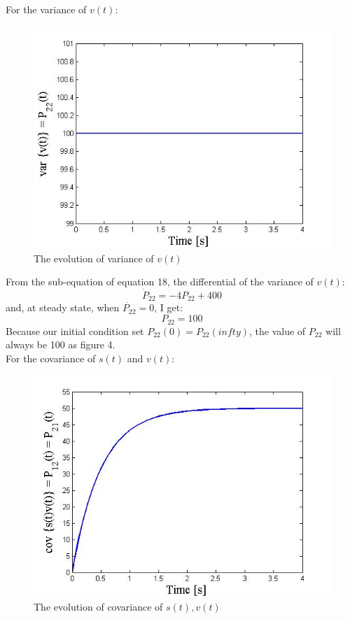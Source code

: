 \documentclass{article}
\begin{document}
\noindent For the variance of $v(t)$:
\begin{figure}[H]
\begin{center}
	\includegraphics[scale=0.5]{figure/hw4_varv.jpg}
	\caption{The evolution of variance of $ v(t) $}
\end{center}
\end{figure}
\noindent From the sub-equation of equation 18, the differential of the variance of $v(t)$:
\begin{equation}
	\dot P_{22}  =  - 4P_{22}  + 400
\end{equation}
and, at steady state, when $\dot{P_{22}}=0$, I get:
\begin{equation}
	P_{22}  = 100
\end{equation}
Because our initial condition set $P_{22}(0)=P_{22}(infty)$, the value of $P_{22}$ will always be 100 as figure 4.\\

\noindent For the covariance of $s(t)$ and $v(t)$:
\begin{figure}[H]
\begin{center}
	\includegraphics[scale=0.5]{figure/hw4_covsv.jpg}
	\caption{The evolution of covariance of $s(t), v(t)$}
\end{center}
\end{figure}
\end{document}
